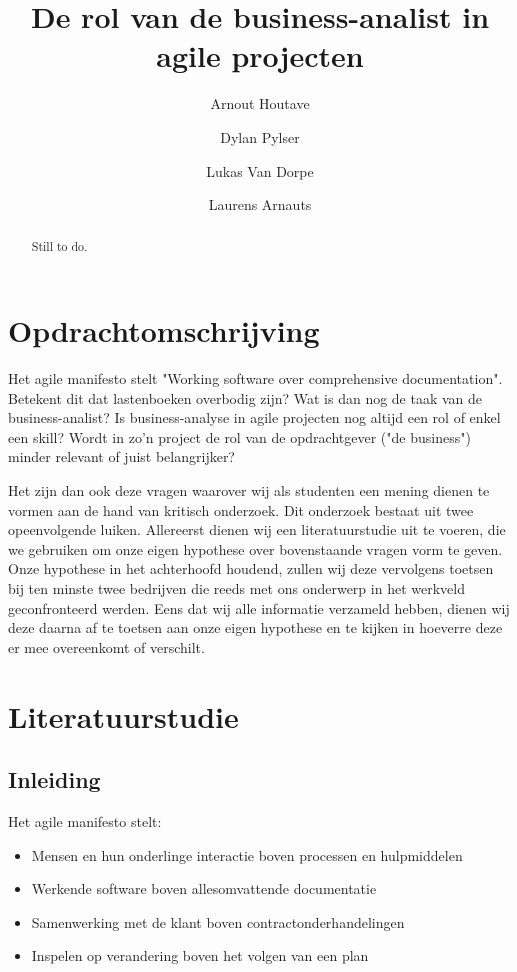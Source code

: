 \documentclass{hogent-article}
\title{De rol van de business-analist in agile projecten}
\author{Arnout Houtave}
\author{Dylan Pylser}
\author{Lukas Van Dorpe}
\author{Laurens Arnauts}
\begin{document}
\begin{abstract}
 Still to do.
\end{abstract}

\tableofcontents


\section{Opdrachtomschrijving}

Het agile manifesto stelt "Working software over comprehensive documentation". Betekent dit dat lastenboeken overbodig zijn? Wat is dan nog de taak van de business-analist? Is business-analyse in agile projecten nog altijd een rol of enkel een skill? Wordt in zo'n project de rol van de opdrachtgever ("de business") minder relevant of juist belangrijker?  

Het zijn dan ook deze vragen waarover wij als studenten een mening dienen te vormen aan de hand van kritisch onderzoek. Dit onderzoek bestaat uit twee opeenvolgende luiken. Allereerst dienen wij een literatuurstudie uit te voeren, die we gebruiken om onze eigen hypothese over bovenstaande vragen vorm te geven. Onze hypothese in het achterhoofd houdend, zullen wij deze vervolgens toetsen bij ten minste twee bedrijven die reeds met ons onderwerp in het werkveld geconfronteerd werden. Eens dat wij alle informatie verzameld hebben, dienen wij deze daarna af te toetsen aan onze eigen hypothese en te kijken in hoeverre deze er mee overeenkomt of verschilt.


\section{Literatuurstudie}

\subsection{Inleiding}

Het agile manifesto stelt:

\begin{itemize}
  \item Mensen en hun onderlinge interactie boven processen en hulpmiddelen
  \item Werkende software boven allesomvattende documentatie
  \item Samenwerking met de klant boven contractonderhandelingen
  \item Inspelen op verandering boven het volgen van een plan
\end{itemize}
\autocite{fowler2001agile}
\end{document}
